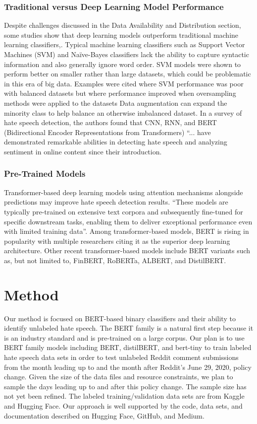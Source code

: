 \documentclass[conference]{IEEEtran}
\begin{document}
\subsubsection{Traditional versus Deep Learning Model Performance}
Despite challenges discussed in the Data Availability and Distribution section, some studies show that deep learning models outperform traditional machine learning classifiers\cite{b10},\cite{b11}. Typical machine learning classifiers such as Support Vector Machines (SVM) and Naïve-Bayes classifiers lack the ability to capture syntactic information and also generally ignore word order\cite{b8}. SVM models were shown to perform better on smaller rather than large datasets, which could be problematic in this era of big data. Examples were cited where SVM performance was poor with balanced datasets but where performance improved when oversampling methods were applied to the datasets\cite{b9} Data augmentation can expand the minority class to help balance an otherwise imbalanced dataset\cite{b8}. In a survey of hate speech detection, the authors found that CNN, RNN, and BERT (Bidirectional Encoder Representations from Transformers) “... have demonstrated remarkable abilities in detecting hate speech and analyzing sentiment in online content since their introduction\cite{b12}. 

\subsubsection{Pre-Trained Models}
Transformer-based deep learning models using attention mechanisms alongside predictions may improve hate speech detection results. “These models are typically pre-trained on extensive text corpora and subsequently fine-tuned for specific downstream tasks, enabling them to deliver exceptional performance even with limited training data”\cite{b9}. Among transformer-based models, BERT is rising in popularity with multiple researchers citing it as the superior deep learning architecture\cite{b9}. Other recent transformer-based models include BERT variants such as, but not limited to, FinBERT, RoBERTa, ALBERT, and DistilBERT\cite{b13}. 

\section{Method}
Our method is focused on BERT-based binary classifiers and their ability to identify unlabeled hate speech. The BERT family is a natural first step because it is an industry standard and is pre-trained on a large corpus. Our plan is to use BERT family models including BERT, distilBERT, and bert-tiny to train labeled hate speech data sets in order to test unlabeled Reddit comment submissions from the month leading up to and the month after Reddit’s June 29, 2020, policy change. Given the size of the data files and resource constraints, we plan to sample the days leading up to and after this policy change. The sample size has not yet been refined. The labeled training/validation data sets are from Kaggle\cite{b14} and Hugging Face\cite{b15}. Our approach is well supported by the code, data sets, and documentation described on Hugging Face, GitHub\cite{b16}, and Medium\cite{b17}.
\end{document}
